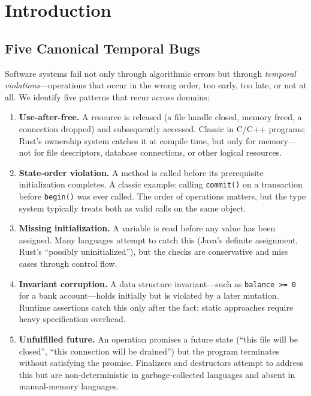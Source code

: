 \documentclass[11pt,a4paper]{article}
\begin{document}
\bigskip

\section{Introduction}

\subsection{Five Canonical Temporal Bugs}

Software systems fail not only through algorithmic errors but through \emph{temporal
violations}---operations that occur in the wrong order, too early, too late, or not at all.
We identify five patterns that recur across domains:

\begin{enumerate}[leftmargin=*,itemsep=4pt]
  \item \textbf{Use-after-free.} A resource is released (a file handle closed, memory freed,
    a connection dropped) and subsequently accessed. Classic in C/C++ programs; Rust's
    ownership system catches it at compile time, but only for memory---not for file
    descriptors, database connections, or other logical resources.

  \item \textbf{State-order violation.} A method is called before its prerequisite
    initialization completes. A classic example: calling \texttt{commit()} on a transaction
    before \texttt{begin()} was ever called. The order of operations matters, but the type
    system typically treats both as valid calls on the same object.

  \item \textbf{Missing initialization.} A variable is read before any value has been
    assigned. Many languages attempt to catch this (Java's definite assignment, Rust's
    ``possibly uninitialized''), but the checks are conservative and miss cases through
    control flow.

  \item \textbf{Invariant corruption.} A data structure invariant---such as
    \texttt{balance >= 0} for a bank account---holds initially but is violated by a later
    mutation. Runtime assertions catch this only after the fact; static approaches require
    heavy specification overhead.

  \item \textbf{Unfulfilled future.} An operation promises a future state (``this file will be
    closed'', ``this connection will be drained'') but the program terminates without
    satisfying the promise. Finalizers and destructors attempt to address this but are
    non-deterministic in garbage-collected languages and absent in manual-memory languages.
\end{enumerate}
\end{document}
